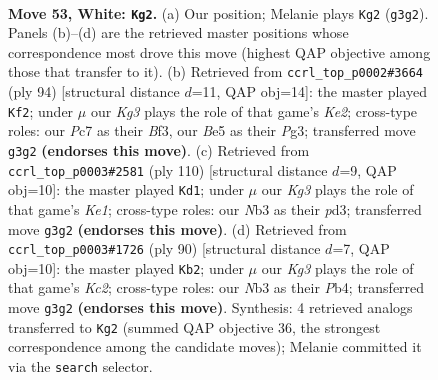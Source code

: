 \documentclass[11pt]{article}
\begin{document}
\clearpage

\begin{figure}[p]\centering
\begin{subfigure}{0.46\textwidth}\centering
\resizebox{\linewidth}{!}{%
\newchessgame
\chessboard[
  setfen={6k1/2P5/2r5/4B3/8/1N4K1/8/8 w - - 19 53},
  showmover=false,
  pgfstyle=straightmove, color=movearrow, markmove={g3-g2}
]}
\caption{}
\end{subfigure}\hfill
\begin{subfigure}{0.46\textwidth}\centering
\resizebox{\linewidth}{!}{%
\newchessgame
\chessboard[
  setfen={8/7p/8/8/3k4/1r3BP1/4K3/8 w - - 3 48},
  showmover=false,
  pgfstyle=straightmove, color=movearrow, markmove={e2-f2}
]}
\caption{}
\end{subfigure}
\\[4pt]
\begin{subfigure}{0.46\textwidth}\centering
\resizebox{\linewidth}{!}{%
\newchessgame
\chessboard[
  setfen={3B4/8/8/5k2/7P/3p4/7r/4K3 w - - 3 56},
  showmover=false,
  pgfstyle=straightmove, color=movearrow, markmove={e1-d1}
]}
\caption{}
\end{subfigure}\hfill
\begin{subfigure}{0.46\textwidth}\centering
\resizebox{\linewidth}{!}{%
\newchessgame
\chessboard[
  setfen={1k6/8/8/8/PP6/1B6/2K5/r7 w - - 3 46},
  showmover=false,
  pgfstyle=straightmove, color=movearrow, markmove={c2-b2}
]}
\caption{}
\end{subfigure}
\caption{\textbf{Move 53, White: \texttt{Kg2}.} (a) Our position; Melanie plays \texttt{Kg2} (\texttt{g3g2}). Panels (b)--(d) are the retrieved master positions whose correspondence most drove this move (highest QAP objective among those that transfer to it). (b) Retrieved from \texttt{ccrl\_top\_p0002\#3664} (ply 94) [structural distance $d$=11, QAP obj=14]: the master played \texttt{Kf2}; under $\mu$ our \emph{Kg3} plays the role of that game's \emph{Ke2}; cross-type roles: our \emph{P}c7 as their \emph{B}f3, our \emph{B}e5 as their \emph{P}g3; transferred move \texttt{g3g2} \textbf{(endorses this move)}. (c) Retrieved from \texttt{ccrl\_top\_p0003\#2581} (ply 110) [structural distance $d$=9, QAP obj=10]: the master played \texttt{Kd1}; under $\mu$ our \emph{Kg3} plays the role of that game's \emph{Ke1}; cross-type roles: our \emph{N}b3 as their \emph{p}d3; transferred move \texttt{g3g2} \textbf{(endorses this move)}. (d) Retrieved from \texttt{ccrl\_top\_p0003\#1726} (ply 90) [structural distance $d$=7, QAP obj=10]: the master played \texttt{Kb2}; under $\mu$ our \emph{Kg3} plays the role of that game's \emph{Kc2}; cross-type roles: our \emph{N}b3 as their \emph{P}b4; transferred move \texttt{g3g2} \textbf{(endorses this move)}. Synthesis: 4 retrieved analogs transferred to \texttt{Kg2} (summed QAP objective 36, the strongest correspondence among the candidate moves); Melanie committed it via the \texttt{search} selector.}
\label{fig:thought-m104}
\end{figure}
\end{document}
